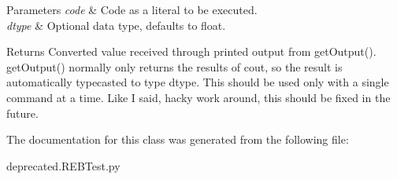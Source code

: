 \begin{DoxyParams}{Parameters}
{\em code} & Code as a literal to be executed. \\
\hline
{\em dtype} & Optional data type, defaults to float. \\
\hline
\end{DoxyParams}
\begin{DoxyReturn}{Returns}
Converted value received through printed output from get\+Output(). get\+Output() normally only returns the results of cout, so the result is automatically typecasted to type dtype. This should be used only with a single command at a time. Like I said, hacky work around, this should be fixed in the future. 
\end{DoxyReturn}


The documentation for this class was generated from the following file\+:\begin{DoxyCompactItemize}
\item 
deprecated.\+R\+E\+B\+Test.\+py\end{DoxyCompactItemize}
